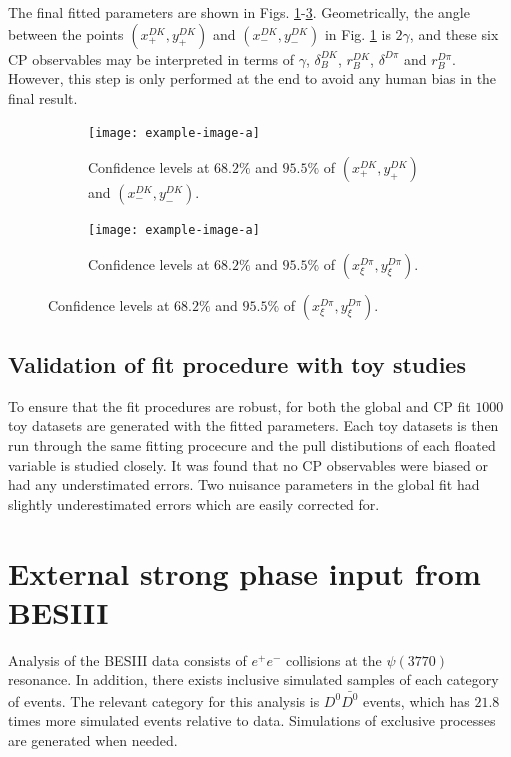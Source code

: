 \documentclass[12pt, a4paper, notitlepage, onecolumn]{article}
\numberwithin{equation}{section}
\begin{document}
The final fitted parameters are shown in Figs. \ref{fig_xpm_ypm}-\ref{fig_xxi_yxi}. Geometrically, the angle between the points $(x_+^{DK}, y_+^{DK})$ and $(x_-^{DK}, y_-^{DK})$ in Fig. \ref{fig_xpm_ypm} is $2\gamma$, and these six CP observables may be interpreted in terms of $\gamma$, $\delta_B^{DK}$, $r_B^{DK}$, $\delta^{D\pi}$ and $r_B^{D\pi}$. However, this step is only performed at the end to avoid any human bias in the final result.

\begin{figure}[H] 
  \centering
  \begin{subfigure}{0.5\textwidth}
    \centering
    \texttt{[image: example-image-a]}
    \caption{Confidence levels at $68.2\%$ and $95.5\%$ of $(x_+^{DK}, y_+^{DK})$ and $(x_-^{DK}, y_-^{DK})$.}
    \label{fig_xpm_ypm}
  \end{subfigure}%
  \begin{subfigure}{0.5\textwidth}
    \centering
    \texttt{[image: example-image-a]}
  \caption{Confidence levels at $68.2\%$ and $95.5\%$ of $(x_\xi^{D\pi}, y_\xi^{D\pi})$.}
    \label{fig_xxi_yxi}
  \end{subfigure}
\end{figure}

\subsection{Validation of fit procedure with toy studies}
\noindent To ensure that the fit procedures are robust, for both the global and CP fit $1000$ toy datasets are generated with the fitted parameters. Each toy datasets is then run through the same fitting procecure and the pull distibutions of each floated variable is studied closely. It was found that no CP observables were biased or had any understimated errors. Two nuisance parameters in the global fit had slightly underestimated errors which are easily corrected for.

\section{External strong phase input from BESIII}
\noindent Analysis of the BESIII data consists of $e^+e^-$ collisions at the $\psi(3770)$ resonance. In addition, there exists inclusive simulated samples of each category of events. The relevant category for this analysis is $D^0\bar{D^0}$ events, which has $21.8$ times more simulated events relative to data. Simulations of exclusive processes are generated when needed.
\end{document}
